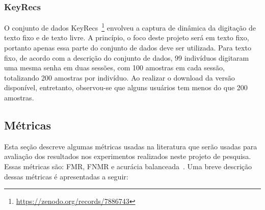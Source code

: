 \subsubsection{KeyRecs}\label{subsubsec:keyrecs}

O conjunto de dados KeyRecs~\footnote{\url{https://zenodo.org/records/7886743}} envolveu a captura de dinâmica da digitação de texto fixo e de texto livre. A princípio, o foco deste projeto será em texto fixo, portanto apenas essa parte do conjunto de dados deve ser utilizada. Para texto fixo, de acordo com a descrição do conjunto de dados, 99 indivíduos digitaram uma mesma senha em duas sessões, com 100 amostras em cada sessão, totalizando 200 amostras por indivíduo. Ao realizar o download da versão disponível, entretanto, observou-se que alguns usuários tem menos do que 200 amostras.


\subsection{Métricas}\label{sec:metricas}

Esta seção descreve algumas métricas usadas na literatura que serão usadas para avaliação dos resultados nos experimentos realizados neste projeto de pesquisa. Essas métricas são: FMR, FNMR e acurácia balanceada~\cite{Precise2014, Ferlini2021eargate}. Uma breve descrição dessas métricas é apresentadas a seguir:

